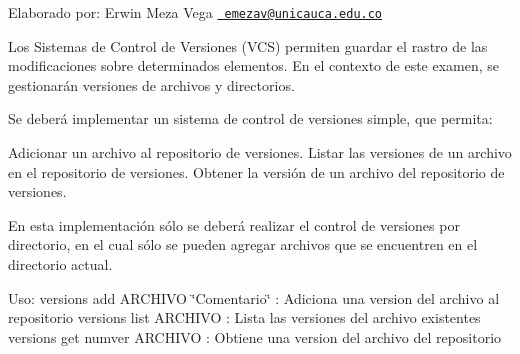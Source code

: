 Elaborado por\+: Erwin Meza Vega \href{mailto:emezav@unicauca.edu.co}{\texttt{ emezav@unicauca.\+edu.\+co}}

Los Sistemas de Control de Versiones (V\+CS) permiten guardar el rastro de las modificaciones sobre determinados elementos. En el contexto de este examen, se gestionarán versiones de archivos y directorios.

Se deberá implementar un sistema de control de versiones simple, que permita\+:

Adicionar un archivo al repositorio de versiones. Listar las versiones de un archivo en el repositorio de versiones. Obtener la versión de un archivo del repositorio de versiones.

En esta implementación sólo se deberá realizar el control de versiones por directorio, en el cual sólo se pueden agregar archivos que se encuentren en el directorio actual.

Uso\+: versions add A\+R\+C\+H\+I\+VO \char`\"{}\+Comentario\char`\"{} \+: Adiciona una version del archivo al repositorio versions list A\+R\+C\+H\+I\+VO \+: Lista las versiones del archivo existentes versions get numver A\+R\+C\+H\+I\+VO \+: Obtiene una version del archivo del repositorio 